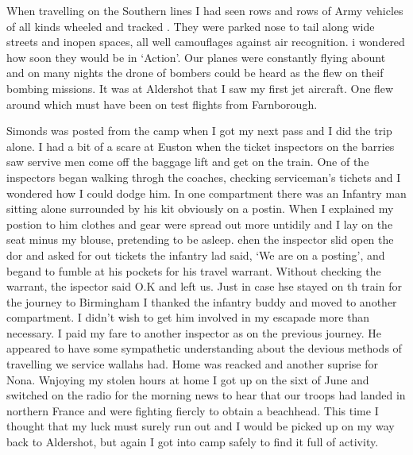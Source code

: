When travelling on the Southern lines I had seen rows and rows of Army
vehicles of all kinds wheeled and tracked . They were parked nose to
tail along wide streets and inopen spaces, all well camouflages
against air recognition. i wondered how soon they would be in
`Action'. Our planes were constantly flying abount and on many nights
the drone of bombers could be heard as the flew on theif bombing
missions. It was at Aldershot that I saw my first jet aircraft. One
flew around which must have been on test flights from Farnborough.

Simonds was posted from the camp when I got my next pass and I did the
trip alone. I had a bit of a scare at Euston when the ticket
inspectors on the barries saw servive men come off the baggage lift
and get on the train. One of the inspectors began walking throgh the
coaches, checking serviceman's tichets and I wondered how I could
dodge him. In one compartment there was an Infantry man sitting alone
surrounded by his kit obviously on a postin. When I explained my
postion to him clothes and gear were spread out more untidily and I
lay on the seat minus my blouse, pretending to be asleep. ehen the
inspector slid open the dor and asked for out tickets the infantry lad
said, `We are on a posting', and begand to fumble at his pockets for
his travel warrant. Without checking the warrant, the ispector said
O.K and left us. Just in case hse stayed on th train for the journey
to Birmingham I thanked the infantry buddy and moved to another
compartment. I didn't wish to get him involved in my escapade more
than necessary. I paid my fare to another inspector as on the previous
journey. He appeared to have some sympathetic understanding about the
devious methods of travelling we service wallahs had. Home was reacked
and another suprise for Nona. Wnjoying my stolen hours at home I got
up on the sixt of June and switched on the radio for the morning news
to hear that our troops had landed in northern France and were
fighting fiercly to obtain a beachhead. This time I thought that my
luck must surely run out and I would be picked up on my way back to
Aldershot, but again I got into camp safely to find it full of
activity.

